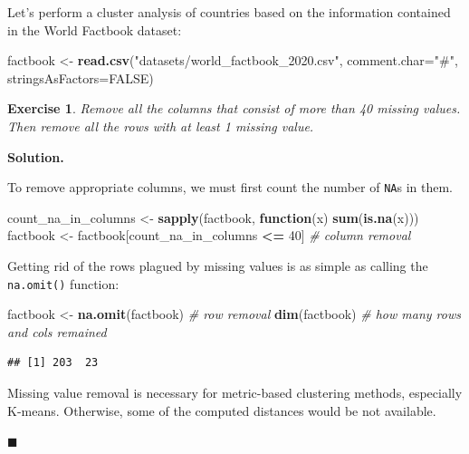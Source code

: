\documentclass[10pt,b5paper,krantz1]{krantz}
\newenvironment{Shaded}{\begin{snugshade}}{\end{snugshade}}
\newcommand{\CommentTok}[1]{\textcolor[rgb]{0.37,0.37,0.37}{\textit{#1}}}
\newcommand{\ControlFlowTok}[1]{\textcolor[rgb]{0.27,0.27,0.27}{\textbf{#1}}}
\newcommand{\DataTypeTok}[1]{\textcolor[rgb]{0.27,0.27,0.27}{#1}}
\newcommand{\DecValTok}[1]{\textcolor[rgb]{0.06,0.06,0.06}{#1}}
\newcommand{\KeywordTok}[1]{\textcolor[rgb]{0.27,0.27,0.27}{\textbf{#1}}}
\newcommand{\NormalTok}[1]{#1}
\newcommand{\OperatorTok}[1]{\textcolor[rgb]{0.43,0.43,0.43}{\textbf{#1}}}
\newcommand{\OtherTok}[1]{\textcolor[rgb]{0.37,0.37,0.37}{#1}}
\newcommand{\StringTok}[1]{\textcolor[rgb]{0.5,0.5,0.5}{#1}}
\newtheorem{exercise}{Exercise}[chapter]
\newenvironment{solution}{%
\bigskip\noindent\textbf{Solution. }%
\it\ignorespaces%
\ignorespaces%
}{\ignorespaces%
\hfill$\blacksquare$%
}
\begin{document}
Let's perform a cluster analysis of countries
based on the information contained in the World Factbook dataset:

\begin{Shaded}
\begin{Highlighting}[]
\NormalTok{factbook <-}\StringTok{ }\KeywordTok{read.csv}\NormalTok{(}\StringTok{"datasets/world_factbook_2020.csv"}\NormalTok{,}
    \DataTypeTok{comment.char=}\StringTok{"#"}\NormalTok{, }\DataTypeTok{stringsAsFactors=}\OtherTok{FALSE}\NormalTok{)}
\end{Highlighting}
\end{Shaded}

\begin{exercise}

Remove all the columns that consist of more than 40 missing values.
Then remove all the rows with at least 1 missing value.

\end{exercise}

\begin{solution}

To remove appropriate columns, we must first count the number
of \texttt{NA}s in them.

\begin{Shaded}
\begin{Highlighting}[]
\NormalTok{count_na_in_columns <-}\StringTok{ }\KeywordTok{sapply}\NormalTok{(factbook, }\ControlFlowTok{function}\NormalTok{(x) }\KeywordTok{sum}\NormalTok{(}\KeywordTok{is.na}\NormalTok{(x)))}
\NormalTok{factbook <-}\StringTok{ }\NormalTok{factbook[count_na_in_columns }\OperatorTok{<=}\StringTok{ }\DecValTok{40}\NormalTok{] }\CommentTok{# column removal}
\end{Highlighting}
\end{Shaded}

Getting rid of the rows plagued by missing values is as simple as calling
the \texttt{na.omit()} function:

\begin{Shaded}
\begin{Highlighting}[]
\NormalTok{factbook <-}\StringTok{ }\KeywordTok{na.omit}\NormalTok{(factbook) }\CommentTok{# row removal}
\KeywordTok{dim}\NormalTok{(factbook) }\CommentTok{# how many rows and cols remained}
\end{Highlighting}
\end{Shaded}

\begin{verbatim}
## [1] 203  23
\end{verbatim}

Missing value removal is necessary for metric-based
clustering methods, especially K-means. Otherwise, some of the computed distances
would be not available.

\end{solution}
\end{document}
